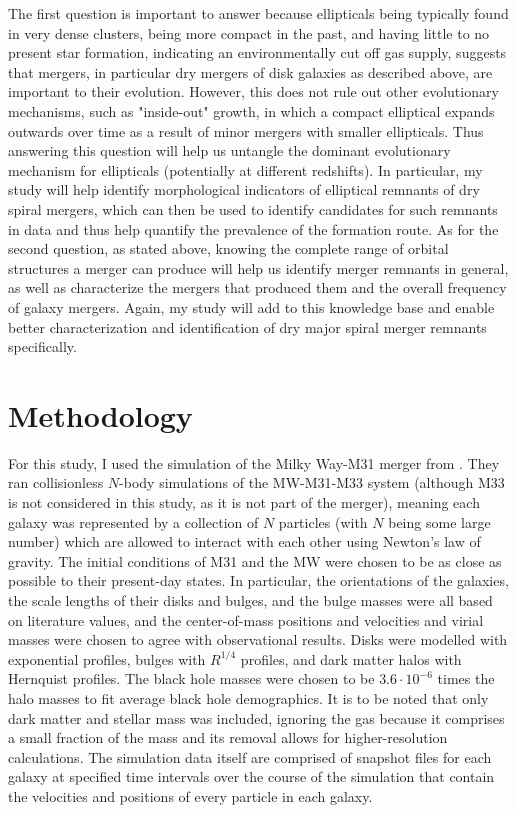 \documentclass[twocolumn]{aastex631}
\begin{document}
The first question is important to answer because ellipticals being typically found in very dense clusters, being more compact in the past, and having little to no present star formation, indicating an environmentally cut off gas supply, suggests that mergers, in particular dry mergers of disk galaxies as described above, are important to their evolution. 
However, this does not rule out other evolutionary mechanisms, such as "inside-out" growth, in which a compact elliptical expands outwards over time as a result of minor mergers with smaller ellipticals.
Thus answering this question will help us untangle the dominant evolutionary mechanism for ellipticals (potentially at different redshifts).
In particular, my study will help identify morphological indicators of elliptical remnants of dry spiral mergers, which can then be used to identify candidates for such remnants in data and thus help quantify the prevalence of the formation route.
As for the second question, as stated above, knowing the complete range of orbital structures a merger can produce will help us identify merger remnants in general, as well as characterize the mergers that produced them and the overall frequency of galaxy mergers.
Again, my study will add to this knowledge base and enable better characterization and identification of dry major spiral merger remnants specifically.

\section{Methodology}

For this study, I used the simulation of the Milky Way-M31 merger from \cite{van_der_Marel+2012}.
They ran collisionless $N$-body simulations of the MW-M31-M33 system (although M33 is not considered in this study, as it is not part of the merger), meaning each galaxy was represented by a collection of $N$ particles (with $N$ being some large number) which are allowed to interact with each other using Newton's law of gravity.
The initial conditions of M31 and the MW were chosen to be as close as possible to their present-day states. 
In particular, the orientations of the galaxies, the scale lengths of their disks and bulges, and the bulge masses were all based on literature values, and the center-of-mass positions and velocities and virial masses were chosen to agree with observational results.
Disks were modelled with exponential profiles, bulges with $R^{1/4}$ profiles, and dark matter halos with Hernquist profiles. 
The black hole masses were chosen to be $3.6 \cdot 10^{-6}$ times the halo masses to fit average black hole demographics.
It is to be noted that only dark matter and stellar mass was included, ignoring the gas because it comprises a small fraction of the mass and its removal allows for higher-resolution calculations.
The simulation data itself are comprised of snapshot files for each galaxy at specified time intervals over the course of the simulation that contain the velocities and positions of every particle in each galaxy.
\end{document}
